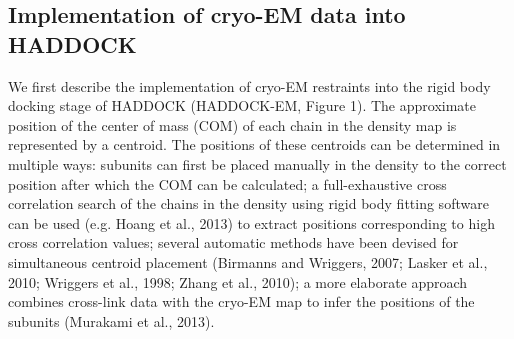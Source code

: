 \subsection{Implementation of cryo-EM data into HADDOCK}

We first describe the implementation of cryo-EM restraints into the rigid body docking stage of HADDOCK (HADDOCK-EM, Figure 1). 
The approximate position of the center of mass (COM) of each chain in the density map is represented by a centroid. 
The positions of these centroids can be determined in multiple ways: subunits can first be placed manually in the density to the correct position after which the COM can be calculated; 
a full-exhaustive cross correlation search of the chains in the density using rigid body fitting software can be used (e.g. Hoang et al., 2013) to extract positions corresponding to high cross correlation values; 
several automatic methods have been devised for simultaneous centroid placement (Birmanns and Wriggers, 2007; Lasker et al., 2010; Wriggers et al., 1998; Zhang et al., 2010); 
a more elaborate approach combines cross-link data with the cryo-EM map to infer the positions of the subunits (Murakami et al., 2013). 

